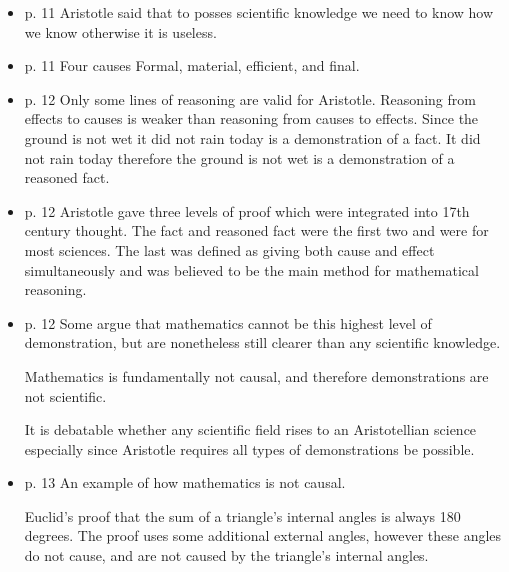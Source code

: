 \documentclass{report}
\begin{document}
\begin{itemize}
    \item p. 11 Aristotle said that to posses scientific
        knowledge we need to know how we know otherwise
        it is useless.
    \item p. 11 Four causes Formal, material, efficient,
        and final.
    \item p. 12 Only some lines of reasoning are valid
        for Aristotle. Reasoning from effects to causes
        is weaker than reasoning from causes
        to effects. Since the ground is not wet
        it did not rain today is a demonstration of a
        fact. It did not rain today therefore the
        ground is not wet is a demonstration of a 
        reasoned fact.
    \item p. 12 Aristotle gave three levels of proof which
        were integrated into 17th century thought. The
        fact and reasoned fact were the first two
        and were for most sciences. The last was
        defined as giving both cause and effect
        simultaneously and was believed to be
        the main method for mathematical reasoning.
    \item p. 12 Some argue that mathematics cannot be
        this highest level of demonstration, but are
        nonetheless still clearer than any scientific
        knowledge.
        \begin{mdframed}
            Mathematics is fundamentally not causal, and therefore
            demonstrations are not scientific.

            It is debatable whether any scientific field rises
            to an Aristotellian science especially since Aristotle
            requires all types of demonstrations be possible.
        \end{mdframed}
    \item p. 13 An example of how mathematics is not causal.
        \begin{mdframed}
            Euclid's proof that the sum of a triangle's internal
            angles is always 180 degrees. The proof uses
            some additional external angles, however these
            angles do not cause, and are not caused by the
            triangle's internal angles.


\end{mdframed}
\end{itemize}
\end{document}
